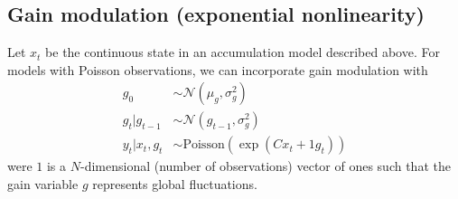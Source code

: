 \documentclass{article}
\begin{document}
\subsection{Gain modulation (exponential nonlinearity)}
Let $x_t$ be the continuous state in an accumulation model described above. For models with Poisson observations, we can incorporate gain modulation \cite{goris2017dissociation} with
\begin{align}
g_0 & \sim \mathcal{N}(\mu_g, \sigma_g^2) \\
g_t | g_{t-1} & \sim \mathcal{N}(g_{t-1}, \sigma_g^2) \\
y_t | x_t, g_t & \sim \mathrm{Poisson}(\exp(C x_t + \mathrm{1} g_t))
\end{align}
were $\mathrm{1}$ is a $N$-dimensional (number of observations) vector of ones such that the gain variable $g$ represents global fluctuations.  
\end{document}
